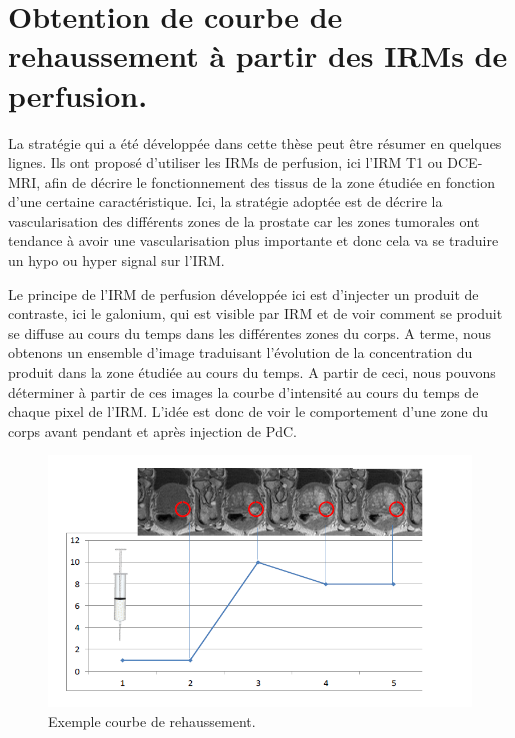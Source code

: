 \pagebreak 

\section{Obtention de courbe de rehaussement à partir des IRMs de perfusion.}

La stratégie qui a été développée dans cette thèse peut être résumer en quelques lignes. Ils ont proposé d'utiliser les IRMs de perfusion, ici l'IRM T1 ou DCE-MRI, afin de décrire le fonctionnement des tissus de la zone étudiée en fonction d'une certaine caractéristique. Ici, la stratégie adoptée est de décrire la vascularisation des différents zones de la prostate car les zones tumorales ont tendance à avoir une vascularisation plus importante et donc cela va se traduire un hypo ou hyper signal sur l'IRM.

\medskip 

Le principe de l'IRM de perfusion développée ici est d'injecter un produit de contraste, ici le galonium, qui est visible par IRM et de voir comment se produit se diffuse au cours du temps dans les différentes zones du corps. A terme, nous obtenons un ensemble d'image traduisant l'évolution de la concentration du produit dans la zone étudiée au cours du temps. A partir de ceci, nous pouvons déterminer à partir de ces images la courbe d'intensité au cours du temps de chaque pixel de l'IRM. L'idée est donc de voir le comportement d'une zone du corps avant pendant et après injection de PdC.

\begin{figure}[H]
\centering
    \includegraphics[scale=0.70,angle=0]{Images/ExempleCourbeDeRehaussement.png}
    \caption{Exemple courbe de rehaussement.}
    \label{fig:ExempleCourbeDeRehaussement}
\end{figure}


